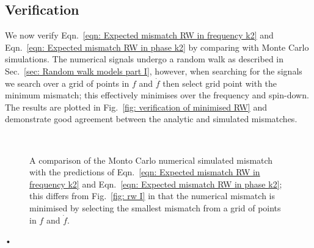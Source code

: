 \subsection{Verification}

We now verify Eqn.~\eqref{eqn: Expected mismatch RW in frequency k2} and
Eqn.~\eqref{eqn: Expected mismatch RW in phase k2} by comparing with Monte
Carlo simulations. The numerical signals undergo a random walk as described in
Sec.~\ref{sec: Random walk models part I}, however, when searching for the
signals we search over a grid of points in $f$ and $\dot{f}$ then select grid point
with the minimum mismatch; this effectively minimises over the frequency and
spin-down. The results are plotted in Fig.~\ref{fig: verification of
minimised RW} and demonstrate good agreement between the analytic and simulated
mismatches.

\begin{figure}[ht]
\centering
{}
\\
\caption{A comparison of the Monto Carlo numerical simulated mismatch with the
predictions of Eqn.~\eqref{eqn: Expected mismatch RW in
frequency k2} and Eqn.~\eqref{eqn: Expected mismatch RW in phase k2}; this differs
from Fig.~\ref{fig: rw I} in that the numerical mismatch is minimised by selecting
the smallest mismatch from a grid of points in $f$ and $\dot{f}$.}
\label{fig: verification of minimised RW}
\end{figure}•
\FloatBarrier
